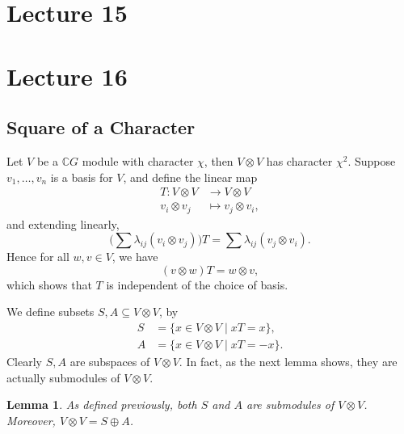 \documentclass[11pt, notitlepage]{article}
\numberwithin{equation}{section}
\theoremstyle{plain}
\newtheorem{lemma}[theorem]{Lemma}
\theoremstyle{definition}
\newcommand{\CG}{{\mathbb{C}G}}
\begin{document}
\section{Lecture 15}
























\section{Lecture 16}




\subsection{Square of a Character}




Let $V$ be a $\CG$ module with character $\chi$, then $V \otimes V$ has character $\chi^2$. Suppose $v_1,\dots,v_n$ is a basis for $V$, and define the linear map
\begin{align*}
    T : V \otimes V &\to V \otimes V\\
    v_i \otimes v_j &\mapsto v_j \otimes v_i,
\end{align*}
and extending linearly,
\[
    \Big(\sum \lambda_{ij}(v_i \otimes v_j)\Big)T = \sum \lambda_{ij}(v_j \otimes v_i).
\]
Hence for all $w,v \in V$, we have
\[
    (v \otimes w)T = w \otimes v,
\]
which shows that $T$ is independent of the choice of basis.

We define subsets $S,A \subseteq V \otimes V$, by
\begin{align*}
    S &= \{x \in V \otimes V \mid xT = x\},\\
    A &= \{x \in V \otimes V \mid xT = -x\}.
\end{align*}
Clearly $S,A$ are subspaces of $V \otimes V$. In fact, as the next lemma shows, they are actually submodules of $V \otimes V$.

\begin{lemma}
As defined previously, both $S$ and $A$ are submodules of $V \otimes V$. Moreover, $V \otimes V = S \oplus A$.
\end{lemma}
\end{document}
